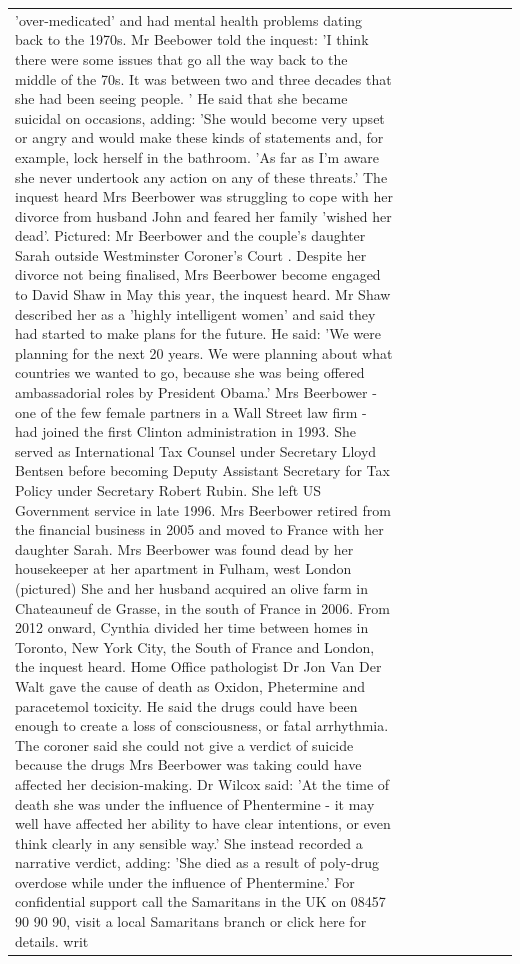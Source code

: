 \begin{table}[H]
\begin{tabular}{lllrlllll}
'over-medicated' and had mental health problems dating back to the 1970s. Mr Beebower told the inquest: 'I think there were some issues that go all the way back to the middle of the 70s. It was between two and three decades that she had been seeing people. ' He said that she became suicidal on occasions, adding: 'She would become very upset or angry and would make these kinds of statements and, for example, lock herself in the bathroom. 'As far as I'm aware she never undertook any action on any of these threats.' The inquest heard Mrs Beerbower was struggling to cope with her divorce from husband John and feared her family 'wished her dead'. Pictured: Mr Beerbower and the couple's daughter Sarah outside Westminster Coroner's Court . Despite her divorce not being finalised, Mrs Beerbower become engaged to David Shaw in May this year, the inquest heard. Mr Shaw described her as a 'highly intelligent women' and said they had started to make plans for the future. He said: 'We were planning for the next 20 years. We were planning about what countries we wanted to go, because she was being offered ambassadorial roles by President Obama.' Mrs Beerbower - one of the few female partners in a Wall Street law firm - had joined the first Clinton administration in 1993. She served as International Tax Counsel under Secretary Lloyd Bentsen before becoming Deputy Assistant Secretary for Tax Policy under Secretary Robert Rubin. She left US Government service in late 1996. Mrs Beerbower retired from the financial business in 2005 and moved to France with her daughter Sarah. Mrs Beerbower was found dead by her housekeeper at her apartment in Fulham, west London (pictured) She and her husband acquired an olive farm in Chateauneuf de Grasse, in the south of France in 2006. From 2012 onward, Cynthia divided her time between homes in Toronto, New York City, the South of France and London, the inquest heard. Home Office pathologist Dr Jon Van Der Walt gave the cause of death as Oxidon, Phetermine and paracetemol toxicity. He said the drugs could have been enough to create a loss of consciousness, or fatal arrhythmia. The coroner said she could not give a verdict of suicide because the drugs Mrs Beerbower was taking could have affected her decision-making. Dr Wilcox said: 'At the time of death she was under the influence of Phentermine - it may well have affected her ability to have clear intentions, or even think clearly in any sensible way.' She instead recorded a narrative verdict, adding: 'She died as a result of poly-drug overdose while under the influence of Phentermine.' For confidential support call the Samaritans in the UK on 08457 90 90 90, visit a local Samaritans branch or click here for details. writ \\

\end{tabular}
\end{table}
